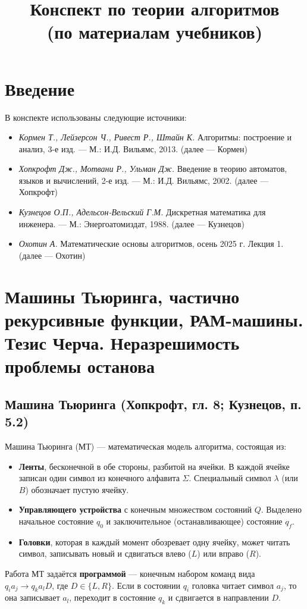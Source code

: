 \documentclass[a4paper,12pt]{article}
\title{Конспект по теории алгоритмов\\ (по материалам учебников)}
\author{}
\date{}
\begin{document}
\maketitle

\section*{Введение}
В конспекте использованы следующие источники:
\begin{itemize}
    \item \textit{Кормен Т., Лейзерсон Ч., Ривест Р., Штайн К.} Алгоритмы: построение и анализ, 3-е изд. --- М.: И.Д. Вильямс, 2013. (далее --- Кормен)
    \item \textit{Хопкрофт Дж., Мотвани Р., Ульман Дж.} Введение в теорию автоматов, языков и вычислений, 2-е изд. --- М.: И.Д. Вильямс, 2002. (далее --- Хопкрофт)
    \item \textit{Кузнецов О.П., Адельсон-Вельский Г.М.} Дискретная математика для инженера. --- М.: Энергоатомиздат, 1988. (далее --- Кузнецов)
    \item \textit{Охотин А.} Математические основы алгоритмов, осень 2025 г. Лекция 1. (далее --- Охотин)
\end{itemize}

\section{Машины Тьюринга, частично рекурсивные функции, РАМ-машины. Тезис Черча. Неразрешимость проблемы останова}

\subsection{Машина Тьюринга (Хопкрофт, гл. 8; Кузнецов, п. 5.2)}
Машина Тьюринга (МТ) --- математическая модель алгоритма, состоящая из:
\begin{itemize}
    \item \textbf{Ленты}, бесконечной в обе стороны, разбитой на ячейки. В каждой ячейке записан один символ из конечного алфавита \( \Sigma \). Специальный символ \( \lambda \) (или \( B \)) обозначает пустую ячейку.
    \item \textbf{Управляющего устройства} с конечным множеством состояний \( Q \). Выделено начальное состояние \( q_0 \) и заключительное (останавливающее) состояние \( q_f \).
    \item \textbf{Головки}, которая в каждый момент обозревает одну ячейку, может читать символ, записывать новый и сдвигаться влево (\( L \)) или вправо (\( R \)).
\end{itemize}
Работа МТ задаётся \textbf{программой} --- конечным набором команд вида \( q_i a_j \to q_k a_l D \), где \( D \in \{L,R\} \). Если в состоянии \( q_i \) головка читает символ \( a_j \), то она записывает \( a_l \), переходит в состояние \( q_k \) и сдвигается в направлении \( D \).
\end{document}
